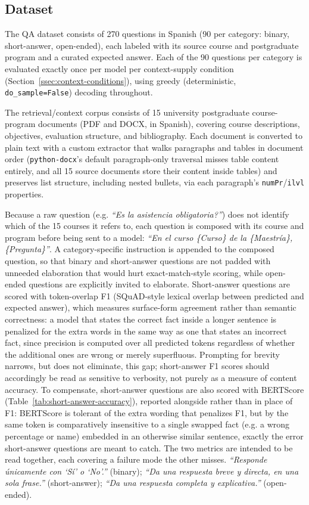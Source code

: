 \documentclass[conference]{IEEEtran}
\begin{document}
\subsection{Dataset}

The QA dataset consists of 270 questions in Spanish (90 per category: binary, short-answer, open-ended), each labeled with its source course and postgraduate program and a curated expected answer.
Each of the 90 questions per category is evaluated exactly once per model per context-supply condition (Section~\ref{ssec:context-conditions}), using greedy (deterministic, \texttt{do\_sample=False}) decoding throughout.

The retrieval/context corpus consists of 15 university postgraduate course-program documents (PDF and DOCX, in Spanish), covering course descriptions, objectives, evaluation structure, and bibliography.
Each document is converted to plain text with a custom extractor that walks paragraphs and tables in document order (\texttt{python-docx}'s default paragraph-only traversal misses table content entirely, and all 15 source documents store their content inside tables) and preserves list structure, including nested bullets, via each paragraph's \texttt{numPr}/\texttt{ilvl} properties.

Because a raw question (e.g. \textit{``\textquestiondown Es la asistencia obligatoria?''}) does not identify which of the 15 courses it refers to, each question is composed with its course and program before being sent to a model: \textit{``En el curso \{Curso\} de la \{Maestr\'ia\}, \{Pregunta\}''}.
A category-specific instruction is appended to the composed question, so that binary and short-answer questions are not padded with unneeded elaboration that would hurt exact-match-style scoring, while open-ended questions are explicitly invited to elaborate.
Short-answer questions are scored with token-overlap F1 (SQuAD-style lexical overlap between predicted and expected answer), which measures surface-form agreement rather than semantic correctness: a model that states the correct fact inside a longer sentence is penalized for the extra words in the same way as one that states an incorrect fact, since precision is computed over all predicted tokens regardless of whether the additional ones are wrong or merely superfluous.
Prompting for brevity narrows, but does not eliminate, this gap; short-answer F1 scores should accordingly be read as sensitive to verbosity, not purely as a measure of content accuracy.
To compensate, short-answer questions are also scored with BERTScore (Table~\ref{tab:short-answer-accuracy}), reported alongside rather than in place of F1: BERTScore is tolerant of the extra wording that penalizes F1, but by the same token is comparatively insensitive to a single swapped fact (e.g. a wrong percentage or name) embedded in an otherwise similar sentence, exactly the error short-answer questions are meant to catch. The two metrics are intended to be read together, each covering a failure mode the other misses.
\textit{``Responde \'unicamente con `S\'i' o `No'.''} (binary);
\textit{``Da una respuesta breve y directa, en una sola frase.''} (short-answer);
\textit{``Da una respuesta completa y explicativa.''} (open-ended).
\end{document}
